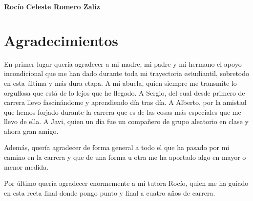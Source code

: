 \noindent \textbf{Rocío Celeste Romero Zaliz}

\chapter*{Agradecimientos}
En primer lugar quería agradecer a mi madre, mi padre y mi hermano el apoyo incondicional que me han dado durante toda mi trayectoria estudiantil, sobretodo en esta última y más dura etapa. A mi abuela, quien siempre me transmite lo orgullosa que está de lo lejos que he llegado. A Sergio, del cual desde primero de carrera llevo fascinándome y aprendiendo día tras día. A Alberto, por la amistad que hemos forjado durante la carrera que es de las cosas más especiales que me llevo de ella. A Javi, quien un día fue un compañero de grupo aleatorio en clase y ahora gran amigo. \bigskip

Además, quería agradecer de forma general a todo el que ha pasado por mi camino en la carrera y que de una forma u otra me ha aportado algo en mayor o menor medida. \bigskip

Por último quería agradecer enormemente a mi tutora Rocío, quien me ha guiado en esta recta final donde pongo punto y final a cuatro años de carrera. 



